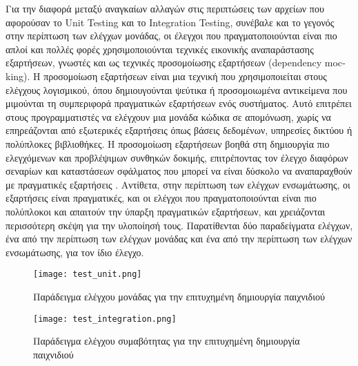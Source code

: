 Για την διαφορά μεταξύ αναγκαίων αλλαγών στις περιπτώσεις των αρχείων
που αφορούσαν το \textlatin{Unit Testing} και το \textlatin{Integration
  Testing}, συνέβαλε και το γεγονός στην περίπτωση των ελέγχων μονάδας,
οι έλεγχοι που πραγματοποιούνται είναι πιο απλοί και πολλές φορές
χρησιμοποιούνται τεχνικές εικονικής αναπαράστασης εξαρτήσεων, γνωστές
και ως τεχνικές προσομοίωσης εξαρτήσεων (\textlatin{dependency
  mocking}). Η προσομοίωση εξαρτήσεων είναι μια τεχνική που
χρησιμοποιείται στους ελέγχους λογισμικού, όπου δημιουγούνται ψεύτικα ή
προσομοιωμένα αντικείμενα που μιμούνται τη συμπεριφορά πραγματικών
εξαρτήσεων ενός συστήματος. Αυτό επιτρέπει στους προγραμματιστές να
ελέγχουν μια μονάδα κώδικα σε απομόνωση, χωρίς να επηρεάζονται από
εξωτερικές εξαρτήσεις όπως βάσεις δεδομένων, υπηρεσίες δικτύου ή
πολύπλοκες βιβλιοθήκες. Η προσομοίωση εξαρτήσεων βοηθά στη δημιουργία
πιο ελεγχόμενων και προβλέψιμων συνθηκών δοκιμής, επιτρέποντας τον
έλεγχο διαφόρων σεναρίων και καταστάσεων σφάλματος που μπορεί να είναι
δύσκολο να αναπαραχθούν με πραγματικές εξαρτήσεις
\cite{freeman2009growing}. Αντίθετα, στην περίπτωση των ελέγχων
ενσωμάτωσης, οι εξαρτήσεις είναι πραγματικές, και οι ελέγχοι που
πραγματοποιούνται είναι πιο πολύπλοκοι και απαιτούν την ύπαρξη
πραγματικών εξαρτήσεων, και χρειάζονται περισσότερη σκέψη για την
υλοποίησή τους. Παρατίθενται δύο παραδείγματα ελέγχων, ένα από την
περίπτωση των ελέγχων μονάδας και ένα από την περίπτωση των ελέγχων
ενσωμάτωσης, για τον ίδιο έλεγχο.

\begin{figure}[H]
  \begin{center}
    \texttt{[image: test\_unit.png]}
    \label{fig:TestUnit}
    \caption{Παράδειγμα ελέγχου μονάδας για την επιτυχημένη δημιουργία
      παιχνιδιού}
  \end{center}
\end{figure}

\begin{figure}[H]
  \begin{center}
    \texttt{[image: test\_integration.png]}
    \label{fig:TestIntegration}
    \caption{Παράδειγμα ελέγχου συμαβότητας για την επιτυχημένη
      δημιουργία παιχνιδιού}
  \end{center}
\end{figure}

